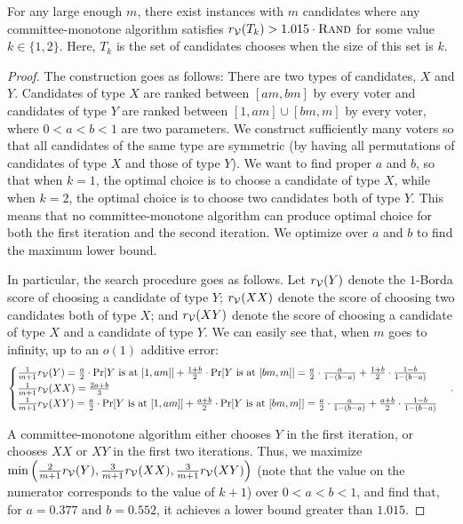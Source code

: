 \begin{theorem}
For any large enough $m$, there exist instances with $m$ candidates where any committee-monotone algorithm \alg{} satisfies $r_{\mathcal{V}}(T_k) > 1.015 \cdot {\normalfont\textsc{Rand}}$ for some value $k \in \{1, 2\}$. Here, $T_k$ is the set of candidates \alg{} chooses when the size of this set is $k$.
\label{thm:monotonicity}
\end{theorem}
\begin{proof}
The construction goes as follows: There are two types of candidates, $X$ and $Y$. Candidates of type $X$ are ranked between $[am, bm]$ by every voter and candidates of type $Y$ are ranked between $[1, am] \cup [bm, m]$ by every voter, where $0 < a < b < 1$ are two parameters. We construct sufficiently many voters so that all candidates of the same type are symmetric (by having all permutations of candidates of type $X$ and those of type $Y$). We want to find proper $a$ and $b$, so that when $k = 1$, the optimal choice is to choose a candidate of type $X$, while when $k = 2$, the optimal choice is to choose two candidates both of type $Y$. This means that no committee-monotone algorithm can produce optimal choice for both the first iteration and the second iteration. We optimize over $a$ and $b$ to find the maximum lower bound.

In particular, the search procedure goes as follows. Let $r_{\mathcal{V}}(Y)$ denote the $1$-Borda score of choosing a candidate of type $Y$; $r_{\mathcal{V}}(XX)$ denote the score of choosing two candidates both of type $X$; and $r_{\mathcal{V}}(XY)$ denote the score of choosing a candidate of type $X$ and a candidate of type $Y$. We can easily see that, when $m$ goes to infinity, up to an $o(1)$ additive error:
\[
\begin{cases}
\frac{1}{m + 1}r_{\mathcal{V}}(Y) = \frac{a}{2} \cdot \Pr[Y \text{ is at } [1, am]] + \frac{1 + b}{2} \cdot \Pr[Y \text{ is at } [bm, m]] = \frac{a}{2} \cdot \frac{a}{1 - (b - a)} + \frac{1 + b}{2} \cdot \frac{1 - b}{1 - (b - a)}\\
\frac{1}{m + 1}r_{\mathcal{V}}(XX) = \frac{2a + b}{3}\\
\frac{1}{m + 1}r_{\mathcal{V}}(XY) = \frac{a}{2} \cdot \Pr[Y \text{ is at } [1, am]] + \frac{a + b}{2} \cdot \Pr[Y \text{ is at } [bm, m]] = \frac{a}{2} \cdot \frac{a}{1 - (b - a)} + \frac{a + b}{2} \cdot \frac{1 - b}{1 - (b - a)}
\end{cases}.
\]

A committee-monotone algorithm either chooses $Y$ in the first iteration, or chooses $XX$ or $XY$ in the first two iterations. Thus, we maximize $\min\left(\frac{2}{m + 1}r_{\mathcal{V}}(Y), \frac{3}{m + 1}r_{\mathcal{V}}(XX), \frac{3}{m + 1}r_{\mathcal{V}}(XY)\right)$ (note that the value on the numerator corresponds to the value of $k + 1$) over $0 < a < b < 1$, and find that, for $a = 0.377$ and $b = 0.552$, it achieves a lower bound greater than $1.015$.
\end{proof}
